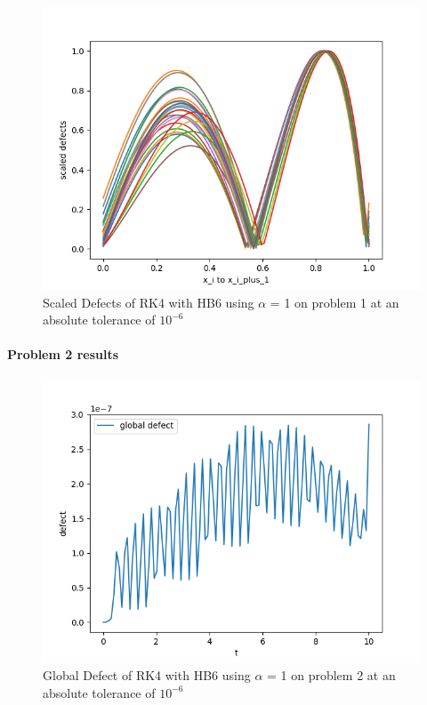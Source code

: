 \documentclass{article}
\begin{document}
\begin{figure}[H]
\centering
\includegraphics[width=0.7\linewidth]{./figures/static_alpha_rk4_with_hb6_p1_scaled_defects}
\caption{Scaled Defects of RK4 with HB6 using $\alpha$ = 1 on problem 1 at an absolute tolerance of $10^{-6}$}
\label{fig:static_alpha_rk4_with_hb6_p1_scaled_defects}
\end{figure}

\paragraph{Problem 2 results}
\begin{figure}[H]
\centering
\includegraphics[width=0.7\linewidth]{./figures/static_alpha_rk4_with_hb6_p2_global_defect}
\caption{Global Defect of RK4 with HB6 using $\alpha$ = 1 on problem 2 at an absolute tolerance of $10^{-6}$}
\label{fig:static_alpha_rk4_with_hb6_p2_global_defect}
\end{figure}
\end{document}
